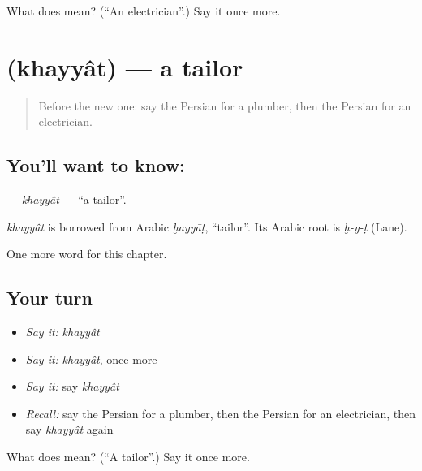 \begin{tcolorbox}[breakable,colback=teal!4,colframe=teal!35!black,title={Before you move on}]
What does  mean? (\textquotedblleft{}An electrician\textquotedblright{}.) Say it once more.
\end{tcolorbox}
\section[\texorpdfstring{\fa{خیاط} (khayyât)}{خیاط (khayyât)}]{ (khayyât) — a tailor}

\label{lesson:FA-C216-khayyat}



\begin{quote}
Before the new one: say the Persian for a plumber, then the Persian for an electrician.
\end{quote}

\subsection*{You'll want to know: }
\textbf{} — \emph{khayyât} — \textquotedblleft{}a tailor\textquotedblright{}.

\begin{cousinweb}
\emph{khayyât} is borrowed from Arabic \emph{ḫayyāṭ}, \textquotedblleft{}tailor\textquotedblright{}. Its Arabic root is \emph{ḫ-y-ṭ} (Lane).
\end{cousinweb}

\begin{grammarlens}[title={What you've built}]
One more word for this chapter.
\end{grammarlens}

\subsection*{Your turn}
\begin{itemize}
\raggedright
  \item \emph{Say it:} \emph{khayyât}
  \item \emph{Say it:} \emph{khayyât}, once more
  \item \emph{Say it:} say \emph{khayyât}
  \item \emph{Recall:} say the Persian for a plumber, then the Persian for an electrician, then say \emph{khayyât} again
\end{itemize}

\begin{tcolorbox}[breakable,colback=teal!4,colframe=teal!35!black,title={Before you move on}]
What does  mean? (\textquotedblleft{}A tailor\textquotedblright{}.) Say it once more.
\end{tcolorbox}
